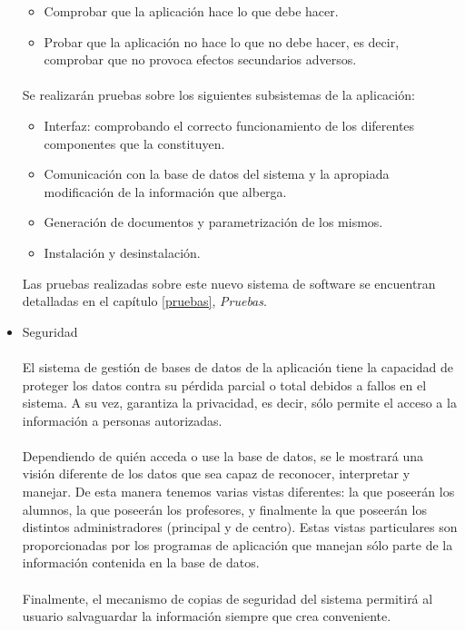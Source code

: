 \begin{itemize}
   \begin{itemize}
      \item Comprobar que la aplicación hace lo que debe hacer.
      \item Probar que la aplicación no hace lo que no debe hacer, es decir,
      comprobar que no provoca efectos secundarios adversos.
   \end{itemize}

   \paragraph{}Se realizarán pruebas sobre los siguientes subsistemas de la
   aplicación:

   \begin{itemize}
      \item Interfaz: comprobando el correcto funcionamiento de los diferentes
      componentes que la constituyen.
      \item Comunicación con la base de datos del sistema y la apropiada
      modificación de la información que alberga.
      \item Generación de documentos y parametrización de los mismos.
      \item Instalación y desinstalación.
   \end{itemize}

   Las pruebas realizadas sobre este nuevo sistema de software se
   encuentran detalladas en el capítulo \ref{pruebas}, \textit{Pruebas}.


 \item Seguridad

   \paragraph{}El sistema de gestión de bases de datos de la aplicación tiene la
   capacidad de proteger los datos contra su pérdida parcial o total debidos a
   fallos en el sistema. A su vez, garantiza la privacidad, es decir, sólo
   permite el acceso a la información a personas autorizadas.

   \paragraph{}Dependiendo de quién acceda o use la base de datos, se le
   mostrará una visión diferente de los datos que sea capaz de reconocer,
   interpretar y manejar. De esta manera tenemos varias vistas diferentes: la
   que poseerán los alumnos, la que poseerán los profesores, y finalmente la que
   poseerán los distintos administradores (principal y de centro). Estas vistas
   particulares son proporcionadas por los programas de aplicación que manejan
   sólo parte de la información contenida en la base de datos.


   \paragraph{}Finalmente, el mecanismo de copias de seguridad del sistema
   permitirá al usuario salvaguardar la información siempre que crea
   conveniente.

\end{itemize}
